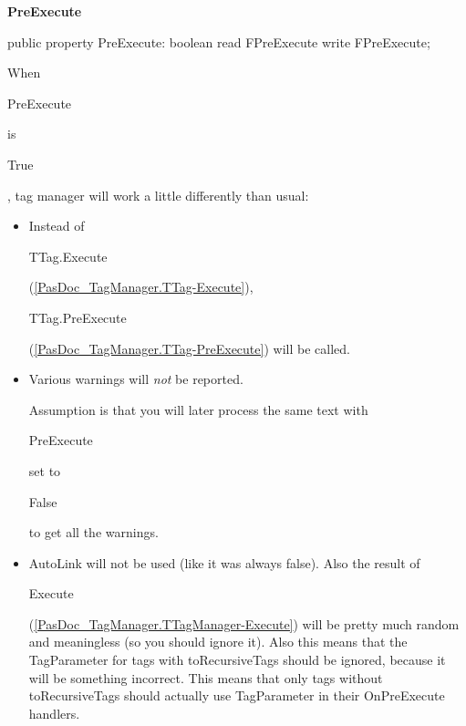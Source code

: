 \documentclass{report}
\newif\ifpdf
\begin{document}
\begin{list}{}
\begin{flushleft}
\ifpdf
\end{flushleft}
\fi


\par  \label{PasDoc_TagManager.TTagManager-PreExecute}
\item[\textbf{PreExecute}\hfill]
\ifpdf
\begin{flushleft}
\fi
\begin{ttfamily}
public property PreExecute: boolean
      read FPreExecute write FPreExecute;\end{ttfamily}

\ifpdf
\end{flushleft}
\fi


\par When \begin{ttfamily}PreExecute\end{ttfamily} is \begin{ttfamily}True\end{ttfamily}, tag manager will work a little differently than usual:

\begin{itemize}
\item Instead of \begin{ttfamily}TTag.Execute\end{ttfamily}(\ref{PasDoc_TagManager.TTag-Execute}), \begin{ttfamily}TTag.PreExecute\end{ttfamily}(\ref{PasDoc_TagManager.TTag-PreExecute}) will be called.
\item Various warnings will \textit{not} be reported.

Assumption is that you will later process the same text with \begin{ttfamily}PreExecute\end{ttfamily} set to \begin{ttfamily}False\end{ttfamily} to get all the warnings.
\item AutoLink will not be used (like it was always false). Also the result of \begin{ttfamily}Execute\end{ttfamily}(\ref{PasDoc_TagManager.TTagManager-Execute}) will be pretty much random and meaningless (so you should ignore it). Also this means that the TagParameter for tags with toRecursiveTags should be ignored, because it will be something incorrect. This means that only tags without toRecursiveTags should actually use TagParameter in their OnPreExecute handlers.


\end{itemize}
\end{list}
\end{document}
